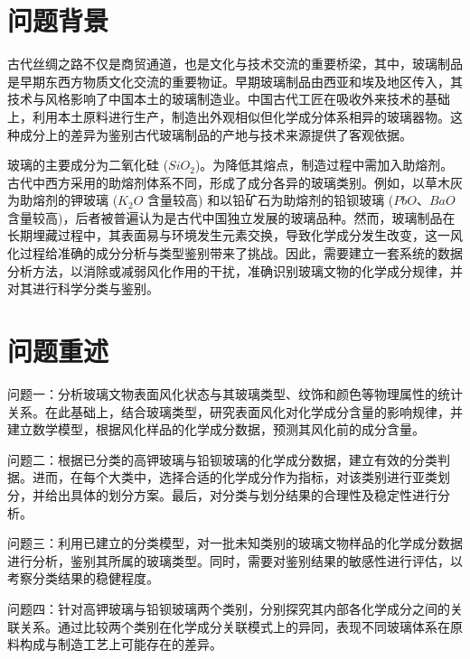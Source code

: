 \section{问题背景}

古代丝绸之路不仅是商贸通道，也是文化与技术交流的重要桥梁，其中，玻璃制品是早期东西方物质文化交流的重要物证。早期玻璃制品由西亚和埃及地区传入，其技术与风格影响了中国本土的玻璃制造业。中国古代工匠在吸收外来技术的基础上，利用本土原料进行生产，制造出外观相似但化学成分体系相异的玻璃器物。这种成分上的差异为鉴别古代玻璃制品的产地与技术来源提供了客观依据。

玻璃的主要成分为二氧化硅 ($SiO_2$)。为降低其熔点，制造过程中需加入助熔剂。古代中西方采用的助熔剂体系不同，形成了成分各异的玻璃类别。例如，以草木灰为助熔剂的钾玻璃 ($K_2O$ 含量较高) 和以铅矿石为助熔剂的铅钡玻璃 ($PbO$、$BaO$ 含量较高)，后者被普遍认为是古代中国独立发展的玻璃品种。然而，玻璃制品在长期埋藏过程中，其表面易与环境发生元素交换，导致化学成分发生改变，这一风化过程给准确的成分分析与类型鉴别带来了挑战。因此，需要建立一套系统的数据分析方法，以消除或减弱风化作用的干扰，准确识别玻璃文物的化学成分规律，并对其进行科学分类与鉴别。




\section{问题重述}

问题一：分析玻璃文物表面风化状态与其玻璃类型、纹饰和颜色等物理属性的统计关系。在此基础上，结合玻璃类型，研究表面风化对化学成分含量的影响规律，并建立数学模型，根据风化样品的化学成分数据，预测其风化前的成分含量。

问题二：根据已分类的高钾玻璃与铅钡玻璃的化学成分数据，建立有效的分类判据。进而，在每个大类中，选择合适的化学成分作为指标，对该类别进行亚类划分，并给出具体的划分方案。最后，对分类与划分结果的合理性及稳定性进行分析。

问题三：利用已建立的分类模型，对一批未知类别的玻璃文物样品的化学成分数据进行分析，鉴别其所属的玻璃类型。同时，需要对鉴别结果的敏感性进行评估，以考察分类结果的稳健程度。

问题四：针对高钾玻璃与铅钡玻璃两个类别，分别探究其内部各化学成分之间的关联关系。通过比较两个类别在化学成分关联模式上的异同，表现不同玻璃体系在原料构成与制造工艺上可能存在的差异。

